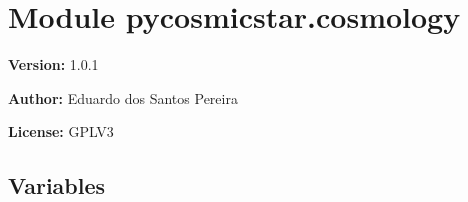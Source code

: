 %
%
%


\section{Module pycosmicstar.cosmology}

    \label{pycosmicstar:cosmology}
\textbf{Version:} 1.0.1



\textbf{Author:} Eduardo dos Santos Pereira



\textbf{License:} GPLV3





  \subsection{Variables}


